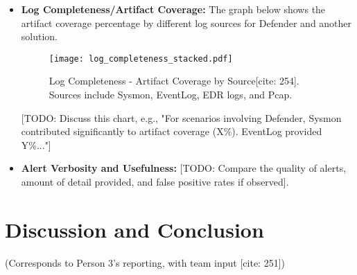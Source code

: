 \documentclass[11pt]{article}
\begin{document}
\begin{itemize}
		\item \textbf{Log Completeness/Artifact Coverage:}
		The graph below shows the artifact coverage percentage by different log sources for Defender and another solution.
		\begin{figure}[H]
			\centering
			\texttt{[image: log\_completeness\_stacked.pdf]}
			\caption{Log Completeness - Artifact Coverage by Source[cite: 254]. Sources include Sysmon, EventLog, EDR logs, and Pcap.}
			\label{fig:log_completeness}
		\end{figure}
		[TODO: Discuss this chart, e.g., "For scenarios involving Defender, Sysmon contributed significantly to artifact coverage (X\%). EventLog provided Y\%..."]
		\item \textbf{Alert Verbosity and Usefulness:} [TODO: Compare the quality of alerts, amount of detail provided, and false positive rates if observed].
	\end{itemize}
	\newpage
	
	\section{Discussion and Conclusion}
	(Corresponds to Person 3's reporting, with team input [cite: 251])
\end{document}
